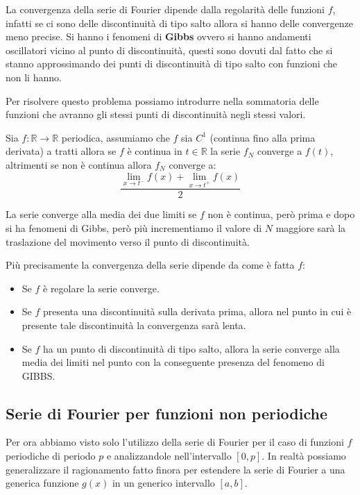 La convergenza della serie di Fourier dipende dalla regolarità delle funzioni $f$,
infatti se ci sono delle discontinuità di tipo salto allora si hanno delle
convergenze meno precise. Si hanno i fenomeni di \textbf{Gibbs} ovvero si hanno andamenti
oscillatori vicino al punto di discontinuità, questi sono dovuti dal fatto che si
stanno approssimando dei punti di discontinuità di tipo salto con funzioni che non
li hanno.

Per risolvere questo problema possiamo introdurre nella sommatoria delle funzioni
che avranno gli stessi punti di discontinuità negli stessi valori.

\begin{teorema}
    Sia $f:\mathbb{R}\to \mathbb{R}$ periodica, assumiamo che $f$ sia $C^1$ (continua
    fino alla prima derivata) a tratti allora se $f$ è continua in $t \in \mathbb{R}$
    la serie $f_N$ converge a $f(t)$, altrimenti se non è continua allora $f_N$
    converge a:
    \begin{equation*}
        \frac{\lim_{x\to t^-}f(x) +\lim_{x\to t^+}f(x)}{2}
    \end{equation*}
\end{teorema}
La serie converge alla media dei due limiti se $f$ non è continua, però prima e
dopo si ha fenomeni di Gibbs, però più incrementiamo il valore di $N$ maggiore
sarà la traslazione del movimento verso il punto di discontinuità.

Più precisamente la convergenza della serie dipende da come è fatta $f$:
\begin{itemize}
    \item Se $f$ è regolare la serie converge.
    \item Se $f$ presenta una discontinuità sulla derivata prima, allora nel
          punto in cui è presente tale discontinuità la convergenza sarà lenta.
    \item Se $f$ ha un punto di discontinuità di tipo salto, allora la serie
          converge alla media dei limiti nel punto con la conseguente presenza
          del fenomeno di GIBBS.
\end{itemize}
\subsection{Serie di Fourier per funzioni non periodiche}
Per ora abbiamo visto solo l'utilizzo della serie di Fourier per il caso di funzioni
$f$ periodiche di periodo $p$ e analizzandole nell'intervallo $[0,p]$. In realtà
possiamo generalizzare il ragionamento fatto finora per estendere la serie di Fourier
a una generica funzione $g(x)$ in un generico intervallo $[a,b]$.

